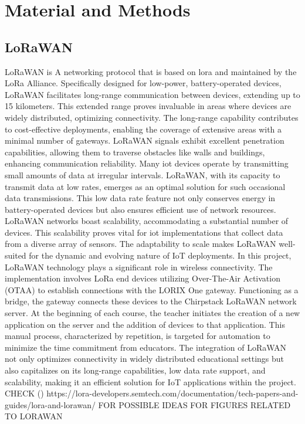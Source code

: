 
\chapter{Material and Methods} \label{ch:mat_met}
\section{LoRaWAN}
LoRaWAN is A networking protocol that is based on \gls{lora} and maintained by the LoRa Alliance.
Specifically designed for low-power, battery-operated devices, LoRaWAN facilitates long-range communication between devices, extending up to 15 kilometers.
This extended range proves invaluable in areas where devices are widely distributed, optimizing connectivity.
The long-range capability contributes to cost-effective deployments, enabling the coverage of extensive areas with a minimal number of gateways.
LoRaWAN signals exhibit excellent penetration capabilities, allowing them to traverse obstacles like walls and buildings, enhancing communication reliability.
Many \gls{iot} devices operate by transmitting small amounts of data at irregular intervals.
LoRaWAN, with its capacity to transmit data at low rates, emerges as an optimal solution for such occasional data transmissions.
This low data rate feature not only conserves energy in battery-operated devices but also ensures efficient use of network resources.
LoRaWAN networks boast scalability, accommodating a substantial number of devices.
This scalability proves vital for \gls{iot} implementations that collect data from a diverse array of sensors.
The adaptability to scale makes LoRaWAN well-suited for the dynamic and evolving nature of IoT deployments.
In this project, LoRaWAN technology plays a significant role in wireless connectivity.
The implementation involves LoRa end devices utilizing Over-The-Air Activation (OTAA) to establish connections with the LORIX One gateway.
Functioning as a bridge, the gateway connects these devices to the Chirpstack LoRaWAN network server.
At the beginning of each course, the teacher initiates the creation of a new application on the server and the addition of devices to that application.
This manual process, characterized by repetition, is targeted for automation to minimize the time commitment from educators.
The integration of LoRaWAN not only optimizes connectivity in widely distributed educational settings but also capitalizes on its long-range capabilities, low data rate support, and scalability, making it an efficient solution for IoT applications within the project.
\cite{lora-developer-portal:about}
CHECK  (\cite{}) https://lora-developers.semtech.com/documentation/tech-papers-and-guides/lora-and-lorawan/ FOR POSSIBLE IDEAS FOR FIGURES RELATED TO LORAWAN

